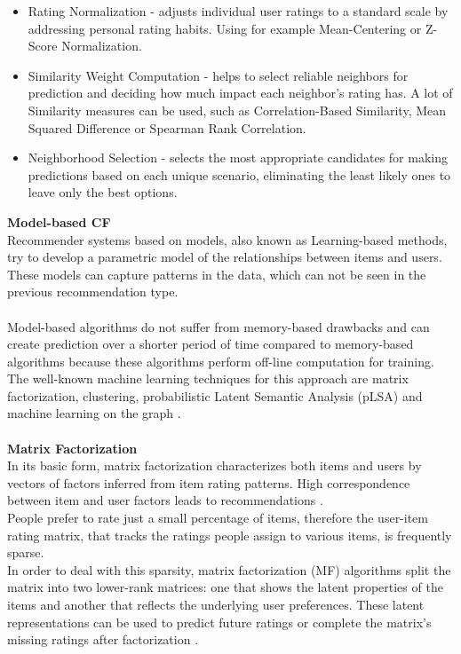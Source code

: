 \documentclass[10pt,oneside,english,a4paper]{article}
\begin{document}
\begin{itemize}
\item Rating Normalization - adjusts individual user ratings to a standard scale by addressing personal rating habits. Using for example Mean-Centering or Z-Score Normalization. 
\item Similarity Weight Computation - helps to select reliable neighbors for prediction and deciding how much impact each neighbor's rating has. A lot of Similarity measures can be used, such as Correlation-Based Similarity, Mean Squared Difference or Spearman Rank Correlation. 
\item Neighborhood Selection - selects the most appropriate candidates for making predictions based on each unique scenario, eliminating the least likely ones to leave only the best options.
\end{itemize}
%
%
\textbf{Model-based CF}\\
Recommender systems based on models, also known as Learning-based methods, try to develop a parametric model of the relationships between items and users. These models can capture patterns in the data, which can not be seen in the previous recommendation type. \\\\
Model-based algorithms do not suffer from memory-based drawbacks and can create prediction over a shorter period of time compared to memory-based algorithms because these algorithms perform off-line computation for training. 
The well-known machine learning techniques for this approach are matrix factorization, clustering, probabilistic Latent Semantic Analysis (pLSA) and machine learning on the graph \cite{NILASHI2018507}. \\\\
%
%
%
\textbf{Matrix Factorization}\\
In its basic form, matrix factorization characterizes both items and users by vectors of factors inferred from item rating patterns. High correspondence between item and user factors leads to recommendations \cite{5197422}. \\
People prefer to rate just a small percentage of items, therefore the user-item rating matrix, that tracks the ratings people assign to various items, is frequently sparse.\\
In order to deal with this sparsity, matrix factorization (MF) algorithms split the matrix into two lower-rank matrices: one that shows the latent properties of the items and another that reflects the underlying user preferences. These latent representations can be used to predict future ratings or complete the matrix's missing ratings after factorization \cite{Tokala2023}.\\\\
\end{document}
